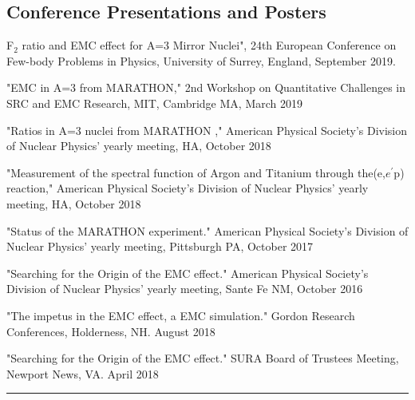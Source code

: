 \documentclass[12pt,letterpaper]{article}
\begin{document}
\subsection*{Conference Presentations and Posters}
\begin{itemize*}
	\item F$_2$ ratio and EMC effect for A=3 Mirror Nuclei", 24th European Conference on Few-body Problems in Physics, University of Surrey, England, September 2019.
	\item "EMC in A=3 from MARATHON," 2nd Workshop on Quantitative Challenges in SRC and EMC Research,  MIT, Cambridge MA,  March 2019
	\item "Ratios in A=3 nuclei from MARATHON ," American Physical Society's Division of Nuclear Physics' yearly meeting, HA, October 2018
	\item "Measurement of the spectral function of Argon and Titanium through the(e,$e^\prime$p) reaction," American Physical Society's Division of Nuclear Physics' yearly meeting, HA, October 2018
	\item "Status of the MARATHON experiment." American Physical Society's Division of Nuclear Physics' yearly meeting, Pittsburgh PA, October 2017
	\item "Searching for the Origin of the EMC effect." American Physical Society's Division of Nuclear Physics' yearly meeting, Sante Fe NM, October 2016

	\item "The impetus in the EMC effect, a EMC simulation." Gordon Research Conferences, Holderness, NH. August 2018 
	\item "Searching for the Origin of the EMC effect." SURA Board of Trustees Meeting, Newport News, VA. April 2018 
\end{itemize*}
\hrule
\end{document}
